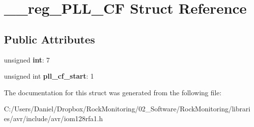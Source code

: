 \hypertarget{struct____reg___p_l_l___c_f}{}\section{\+\_\+\+\_\+reg\+\_\+\+P\+L\+L\+\_\+\+CF Struct Reference}
\label{struct____reg___p_l_l___c_f}
\subsection*{Public Attributes}
\begin{DoxyCompactItemize}
\item 
unsigned {\bfseries int}\+: 7\hypertarget{struct____reg___p_l_l___c_f_ae31c1c7b56a68c2aa65abe45daa1748d}{}\label{struct____reg___p_l_l___c_f_ae31c1c7b56a68c2aa65abe45daa1748d}

\item 
unsigned int {\bfseries pll\+\_\+cf\+\_\+start}\+: 1\hypertarget{struct____reg___p_l_l___c_f_ac52349a750a20944f82cadf6ceae923d}{}\label{struct____reg___p_l_l___c_f_ac52349a750a20944f82cadf6ceae923d}

\end{DoxyCompactItemize}


The documentation for this struct was generated from the following file\+:\begin{DoxyCompactItemize}
\item 
C\+:/\+Users/\+Daniel/\+Dropbox/\+Rock\+Monitoring/02\+\_\+\+Software/\+Rock\+Monitoring/libraries/avr/include/avr/iom128rfa1.\+h\end{DoxyCompactItemize}

